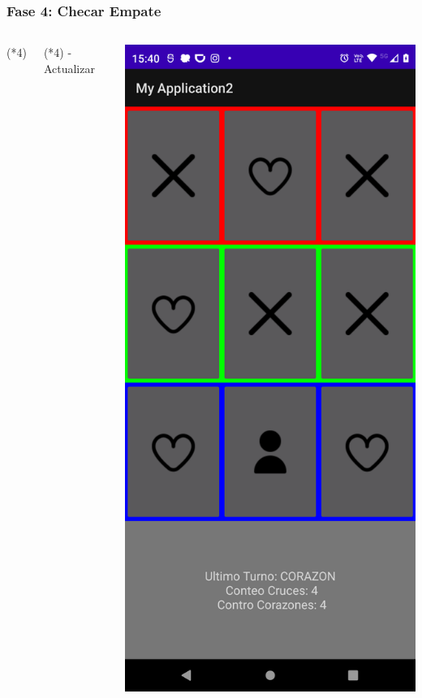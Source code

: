 \begin{frame}[fragile]
\frametitle{Fase 4: Checar Empate} 
\begin{columns}
\begin{block}{(*4)}
\inputminted[linenos,fontsize=\tiny]{kotlin}{00_ComportamientoAplicacionTicTacToe/ChecarEmpate.kt}
\end{block}

\begin{block}{(*4) - Actualizar}
\inputminted[linenos,fontsize=\tiny]{kotlin}{00_ComportamientoAplicacionTicTacToe/listenerVersion3.kt}
\end{block}
\begin{center}
\includegraphics[width=0.95\linewidth]{00_ComportamientoAplicacionTicTacToe/Etapa3_Fase2A.png}  

\end{center}
\end{columns}
\end{frame}
